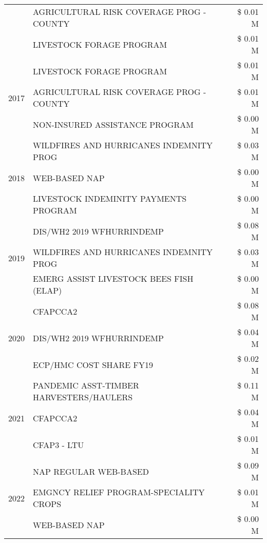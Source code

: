 \begin{tabular}{llr}
 & AGRICULTURAL RISK COVERAGE PROG - COUNTY & \$ 0.01 M \\
 & LIVESTOCK FORAGE PROGRAM & \$ 0.01 M \\
\cline{1-3}
\multirow[t]{3}{*}{2017} & LIVESTOCK FORAGE PROGRAM & \$ 0.01 M \\
 & AGRICULTURAL RISK COVERAGE PROG - COUNTY & \$ 0.01 M \\
 & NON-INSURED ASSISTANCE PROGRAM & \$ 0.00 M \\
\cline{1-3}
\multirow[t]{3}{*}{2018} & WILDFIRES AND HURRICANES INDEMNITY PROG & \$ 0.03 M \\
 & WEB-BASED NAP & \$ 0.00 M \\
 & LIVESTOCK INDEMINITY PAYMENTS PROGRAM & \$ 0.00 M \\
\cline{1-3}
\multirow[t]{3}{*}{2019} & DIS/WH2 2019 WFHURRINDEMP & \$ 0.08 M \\
 & WILDFIRES AND HURRICANES INDEMNITY PROG & \$ 0.03 M \\
 & EMERG ASSIST LIVESTOCK BEES FISH (ELAP) & \$ 0.00 M \\
\cline{1-3}
\multirow[t]{3}{*}{2020} & CFAPCCA2 & \$ 0.08 M \\
 & DIS/WH2 2019 WFHURRINDEMP & \$ 0.04 M \\
 & ECP/HMC COST SHARE FY19 & \$ 0.02 M \\
\cline{1-3}
\multirow[t]{3}{*}{2021} & PANDEMIC ASST-TIMBER HARVESTERS/HAULERS & \$ 0.11 M \\
 & CFAPCCA2 & \$ 0.04 M \\
 & CFAP3 - LTU & \$ 0.01 M \\
\cline{1-3}
\multirow[t]{3}{*}{2022} & NAP REGULAR WEB-BASED & \$ 0.09 M \\
 & EMGNCY RELIEF PROGRAM-SPECIALITY CROPS & \$ 0.01 M \\
 & WEB-BASED NAP & \$ 0.00 M \\
\cline{1-3}
\bottomrule
\end{tabular}

